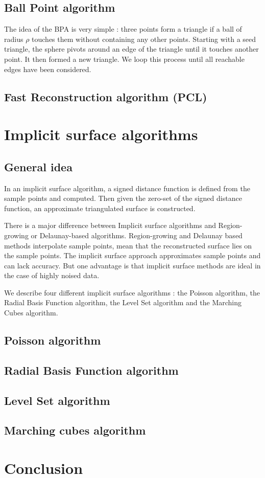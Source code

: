 \documentclass[a4paper]{article}
\begin{document}
\subsection{Ball Point algorithm}
The idea of the BPA is very simple : three points form a triangle if a ball of radius $\rho$ touches them without containing any other points. Starting with a seed triangle, the sphere pivots around an edge of the triangle until it touches another point. It then formed a new triangle. We loop this process until all reachable edges have been considered.


\subsection{Fast Reconstruction algorithm (PCL)}
\newpage

\section{Implicit surface algorithms}
\subsection{General idea}
In an implicit surface algorithm, a signed distance function is defined from the sample points and computed. Then given the zero-set of the signed distance function, an approximate triangulated surface is constructed.

There is a major difference between Implicit surface algorithms and Region-growing or Delaunay-based algorithms. Region-growing and Delaunay based methods interpolate sample points, mean that the reconstructed surface lies on the sample points. The implicit surface approach approximates sample points and can lack accuracy. But one advantage is that implicit surface methods are ideal in the case of highly noised data.

We describe four different implicit surface algorithms : the Poisson algorithm, the Radial Basis Function algorithm, the Level Set algorithm and the Marching Cubes algorithm.


\subsection{Poisson algorithm}

\subsection{Radial Basis Function algorithm}

\subsection{Level Set algorithm}

\subsection{Marching cubes algorithm}


\section*{Conclusion}
\end{document}
